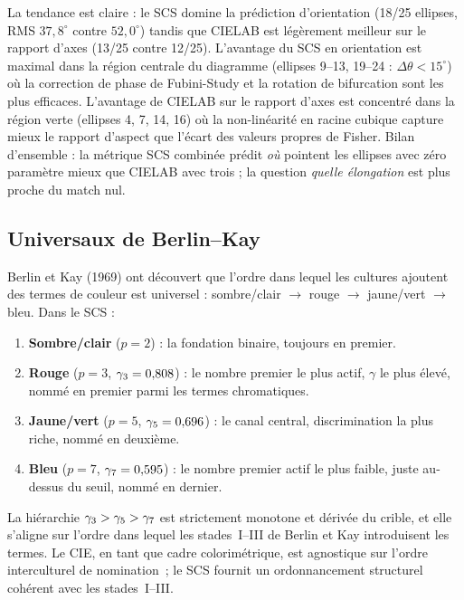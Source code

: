 \documentclass[12pt,a4paper]{article}
\begin{document}
La tendance est claire : le SCS domine la pr\'ediction d'orientation
(18/25 ellipses, RMS $37{,}8^\circ$ contre $52{,}0^\circ$) tandis que
CIELAB est l\'eg\`erement meilleur sur le rapport d'axes (13/25 contre
12/25). L'avantage du SCS en orientation est maximal dans la r\'egion
centrale du diagramme (ellipses 9--13, 19--24 :
$\Delta\theta < 15^\circ$) o\`u la correction de phase de Fubini-Study
et la rotation de bifurcation sont les plus efficaces. L'avantage de
CIELAB sur le rapport d'axes est concentr\'e dans la r\'egion verte
(ellipses 4, 7, 14, 16) o\`u la non-lin\'earit\'e en racine cubique
capture mieux le rapport d'aspect que l'\'ecart des valeurs propres de
Fisher. Bilan d'ensemble : la m\'etrique SCS combin\'ee pr\'edit
\emph{o\`u} pointent les ellipses avec z\'ero param\`etre mieux que
CIELAB avec trois ; la question \emph{quelle \'elongation} est plus
proche du match nul.

\subsection{Universaux de Berlin--Kay}

Berlin et Kay (1969) ont d\'ecouvert que l'ordre dans lequel les
cultures ajoutent des termes de couleur est universel :
sombre/clair $\to$ rouge $\to$ jaune/vert $\to$ bleu. Dans le SCS :

\begin{enumerate}[nosep]
\item \textbf{Sombre/clair} ($p = 2$) : la fondation binaire, toujours
  en premier.
\item \textbf{Rouge} ($p = 3$, $\gamma_{3} = 0{,}808$) : le nombre
  premier le plus actif, $\gamma$ le plus \'elev\'e, nomm\'e en premier
  parmi les termes chromatiques.
\item \textbf{Jaune/vert} ($p = 5$, $\gamma_{5} = 0{,}696$) : le canal
  central, discrimination la plus riche, nomm\'e en deuxi\`eme.
\item \textbf{Bleu} ($p = 7$, $\gamma_{7} = 0{,}595$) : le nombre premier
  actif le plus faible, juste au-dessus du seuil, nomm\'e en dernier.
\end{enumerate}

La hi\'erarchie $\gamma_{3} > \gamma_{5} > \gamma_{7}$ est strictement
monotone et d\'eriv\'ee du crible, et elle s'aligne sur l'ordre dans
lequel les stades~I--III de Berlin et Kay introduisent les termes. Le
CIE, en tant que cadre colorim\'etrique, est agnostique sur l'ordre
interculturel de nomination~; le SCS fournit un ordonnancement
structurel coh\'erent avec les stades~I--III.
\end{document}
